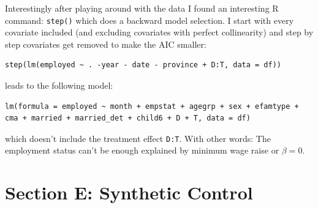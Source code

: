 \documentclass{article}
\begin{document}
\begin{enumerate}[label=(\alph*)]
		Interestingly after playing around with the data I found an interesting R command: \texttt{step()} which does a backward model selection. I start with every covariate included (and excluding covariates with perfect collinearity) and step by step covariates get removed to make the AIC smaller:
		\begin{lstlisting}
step(lm(employed ~ . -year - date - province + D:T, data = df))
		\end{lstlisting}
		leads to the following model:
		\begin{lstlisting}
lm(formula = employed ~ month + empstat + agegrp + sex + efamtype + cma + married + married_det + child6 + D + T, data = df)
		\end{lstlisting}
		which doesn't include the treatment effect \texttt{D:T}. With other words: The employment status can't be enough explained by minimum wage raise or $\beta = 0$.
	\end{enumerate}

	\section*{Section E: Synthetic Control}
	
	\printbibliography 
\end{document}
